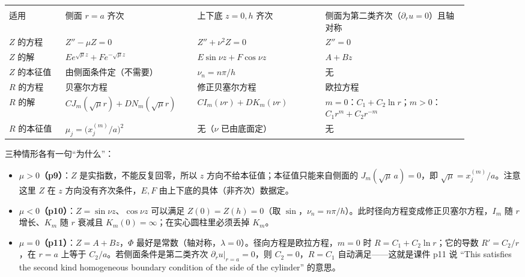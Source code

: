\begin{center}
\tabtop
\begin{tabular}{@{}L{0.11\linewidth}L{0.24\linewidth}L{0.25\linewidth}L{0.29\linewidth}@{}}
 &  &  &  \\
\tabmidrule
适用 & 侧面 $r=a$ 齐次 & 上下底 $z=0,h$ 齐次 & 侧面为第二类齐次（$\partial_ru=0$）且轴对称 \\
$Z$ 的方程 & $Z''-\mu Z=0$ & $Z''+\nu^2Z=0$ & $Z''=0$ \\
$Z$ 的解 & $E e^{\sqrt\mu z}+F e^{-\sqrt\mu z}$ & $E\sin\nu z+F\cos\nu z$ & $A+Bz$ \\
$Z$ 的本征值 & 由侧面条件定（不需要） & $\nu_n=n\pi/h$ & 无 \\
$R$ 的方程 & 贝塞尔方程 & 修正贝塞尔方程 & 欧拉方程 \\
$R$ 的解 & $CJ_m(\sqrt\mu r)+DN_m(\sqrt\mu r)$ & $CI_m(\nu r)+DK_m(\nu r)$ & $m=0$：$C_1+C_2\ln r$；$m>0$：$C_1r^m+C_2r^{-m}$ \\
$R$ 的本征值 & $\mu_j=\big(x_j^{(m)}/a\big)^2$ & 无（$\nu$ 已由底面定） & 无 \\
\end{tabular}
\tabbot
\par{}
\end{center}

三种情形各有一句“为什么”：

\begin{itemize}
  \item \textbf{$\mu>0$（p9）}：$Z$ 是实指数，不能反复回零，所以 $z$ 方向不给本征值；本征值只能来自侧面的 $J_m(\sqrt\mu\,a)=0$，即 $\sqrt\mu=x_j^{(m)}/a$。注意这里 $Z$ 在 $z$ 方向没有齐次条件，$E,F$ 由上下底的具体（非齐次）数据定。
  \item \textbf{$\mu<0$（p10）}：$Z=\sin\nu z$、$\cos\nu z$ 可以满足 $Z(0)=Z(h)=0$（取 $\sin$，$\nu_n=n\pi/h$）。此时径向方程变成修正贝塞尔方程，$I_m$ 随 $r$ 增长、$K_m$ 随 $r$ 衰减且 $K_m(0)=\infty$；在实心圆柱里必须丢掉 $K_m$。
  \item \textbf{$\mu=0$（p11）}：$Z=A+Bz$，$\Phi$ 最好是常数（轴对称，$\lambda=0$）。径向方程是欧拉方程，$m=0$ 时 $R=C_1+C_2\ln r$；它的导数 $R'=C_2/r$，在 $r=a$ 上等于 $C_2/a$。若侧面条件是第二类齐次 $\partial_ru|_{r=a}=0$，则 $C_2=0$，$R=C_1$ 自动满足——这就是课件 p11 说 “This satisfies the second kind homogeneous boundary condition of the side of the cylinder” 的意思。
\end{itemize}

